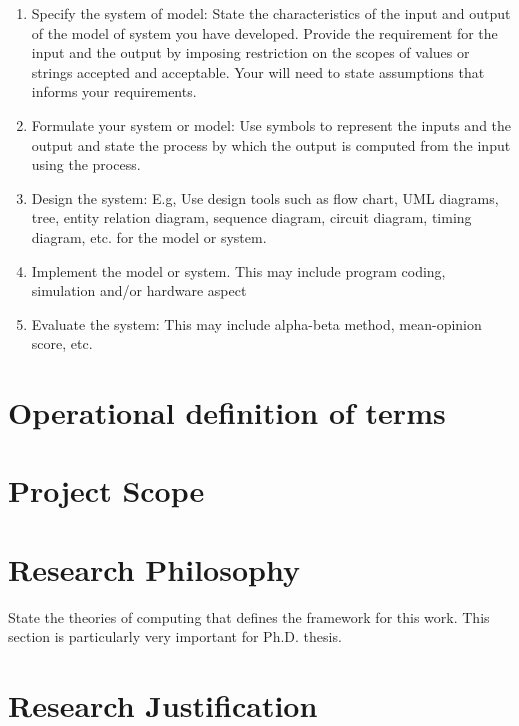 \begin{enumerate}
\item Specify the system of model: State the characteristics of the input and output of the model of system you have developed. Provide the requirement for the input and the output by imposing restriction on the scopes of values or strings accepted and acceptable. Your will need to state assumptions that informs your requirements. \vspace*{-4mm}

\item Formulate your system or model: Use symbols to represent the inputs and the output and state the process by which the output is computed from the input using the process. \vspace*{-4mm}

\item Design the system: E.g, Use design tools such as flow chart, UML diagrams, tree, entity relation diagram, sequence diagram, circuit diagram, timing diagram, etc. for the model or system. \vspace*{-4mm}

\item Implement the model or system. This may include program coding, simulation and/or hardware aspect \vspace*{-4mm}

\item Evaluate the system: This may include alpha-beta method, mean-opinion score, etc. 
\end{enumerate} 

\section{Operational definition of terms}

\section{Project Scope}

\section{Research Philosophy}

State the theories of computing that defines the framework for this work. This section is particularly very important for Ph.D. thesis.


\section{Research Justification}

